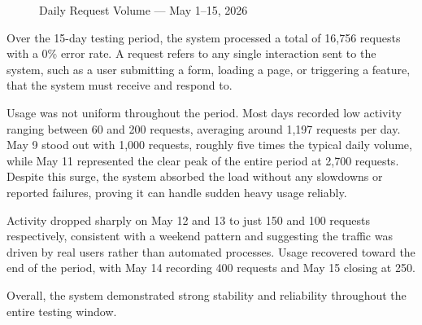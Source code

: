 \begin{figure}[H]
\centering
{}
\caption{Daily Request Volume --- May 1--15, 2026}
\label{fig:daily_requests}
\end{figure}


Over the 15-day testing period, the system processed a total of 16,756 requests with a 0\% error rate. A request refers to any single interaction sent to the system, such as a user submitting a form, loading a page, or triggering a feature, that the system must receive and respond to.

Usage was not uniform throughout the period. Most days recorded low activity ranging between 60 and 200 requests, averaging around 1,197 requests per day. May 9 stood out with 1,000 requests, roughly five times the typical daily volume, while May 11 represented the clear peak of the entire period at 2,700 requests. Despite this surge, the system absorbed the load without any slowdowns or reported failures, proving it can handle sudden heavy usage reliably.

Activity dropped sharply on May 12 and 13 to just 150 and 100 requests respectively, consistent with a weekend pattern and suggesting the traffic was driven by real users rather than automated processes. Usage recovered toward the end of the period, with May 14 recording 400 requests and May 15 closing at 250.

Overall, the system demonstrated strong stability and reliability throughout the entire testing window.



%